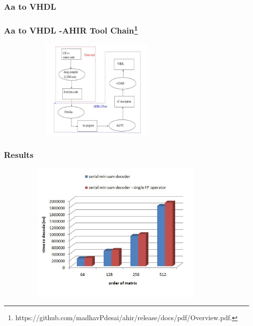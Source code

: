 \documentclass[xcolor=dvipsname]
{beamer}
\begin{document}
\subsubsection{Aa to VHDL}
\begin{frame}[t]
\frametitle{Aa to VHDL -AHIR Tool Chain\footnote{https://github.com/madhavPdesai/ahir/release/docs/pdf/Overview.pdf.} }  
\pause
\begin{figure}
       \includegraphics[height=5cm,width=8cm]{aa2vhdl}
       \end{figure}
\end{frame}
\begin{frame}[t]
\frametitle{Results} 
\vspace{-0.5cm} 
\begin{figure}
       \includegraphics[height=7cm,width=10cm]{serialresult1}
       \end{figure}
\end{frame}
\end{document}
